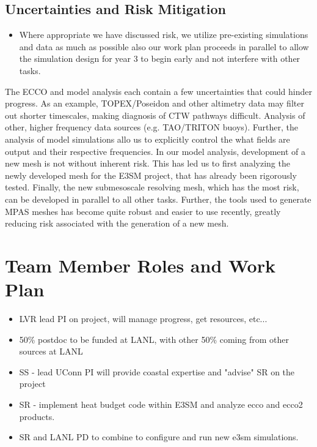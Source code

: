 \subsection{Uncertainties and Risk Mitigation}
\color{red}
\begin{itemize}
    \item Where appropriate we have discussed risk, we utilize pre-existing simulations and data as much as possible also our work plan proceeds in parallel to allow the simulation design for year 3 to begin early and not interfere with other tasks.
\end{itemize}
\color{black}

The ECCO and model analysis each contain a few uncertainties that could hinder progress.  As an example, TOPEX/Poseidon and other altimetry data may filter out shorter timescales, making diagnosis of CTW pathways difficult.  Analysis of other, higher frequency data sources (e.g. TAO/TRITON buoys).  Further, the analysis of model simulations allo us to explicitly control the what fields are output and their respective frequencies.  In our model analysis, development of a new mesh is not without inherent risk.  This has led us to first analyzing the newly developed mesh for the E3SM project, that has already been rigorously tested.  Finally, the new submesoscale resolving mesh, which has the most risk, can be developed in parallel to all other tasks.  Further, the tools used to generate MPAS meshes has become quite robust and easier to use recently, greatly reducing risk associated with the generation of a new mesh.

\section{Team Member Roles and Work Plan}


\begin{itemize}
    \item LVR lead PI on project, will manage progress, get resources, etc...
    \item 50\% postdoc to be funded at LANL, with other 50\% coming from other sources at LANL
    \item SS - lead UConn PI will provide coastal expertise and "advise" SR on the project
    \item SR - implement heat budget code within E3SM and analyze ecco and ecco2 products.
    \item SR and LANL PD to combine to configure and run new e3sm simulations.
\end{itemize}

